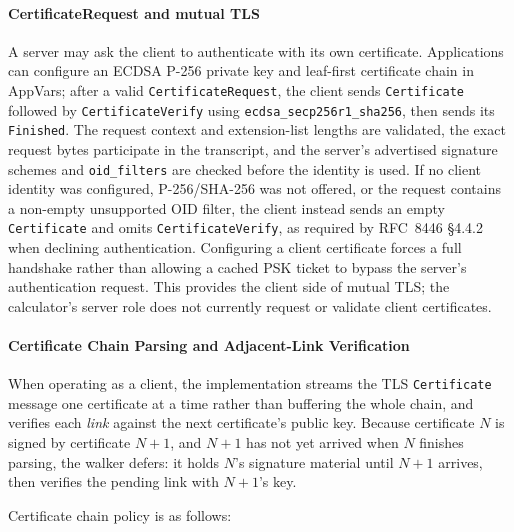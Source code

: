 \documentclass[titlepage]{report}
\begin{document}
	\paragraph{CertificateRequest and mutual TLS}
	A server may ask the client to authenticate with its own certificate. Applications can configure an ECDSA P-256 private key and leaf-first certificate chain in AppVars; after a valid \texttt{CertificateRequest}, the client sends \texttt{Certificate} followed by \texttt{CertificateVerify} using \texttt{ecdsa\_secp256r1\_sha256}, then sends its \texttt{Finished}. The request context and extension-list lengths are validated, the exact request bytes participate in the transcript, and the server's advertised signature schemes and \texttt{oid\_filters} are checked before the identity is used. If no client identity was configured, P-256/SHA-256 was not offered, or the request contains a non-empty unsupported OID filter, the client instead sends an empty \texttt{Certificate} and omits \texttt{CertificateVerify}, as required by RFC~8446 §4.4.2 when declining authentication. Configuring a client certificate forces a full handshake rather than allowing a cached PSK ticket to bypass the server's authentication request. This provides the client side of mutual TLS; the calculator's server role does not currently request or validate client certificates.

	\paragraph{Certificate Chain Parsing and Adjacent-Link Verification}
	When operating as a client, the implementation streams the TLS \texttt{Certificate} message one certificate at a time rather than buffering the whole chain, and verifies each \emph{link} against the next certificate's public key. Because certificate $N$ is signed by certificate $N{+}1$, and $N{+}1$ has not yet arrived when $N$ finishes parsing, the walker defers: it holds $N$'s signature material until $N{+}1$ arrives, then verifies the pending link with $N{+}1$'s key.

	Certificate chain policy is as follows:
\end{document}
